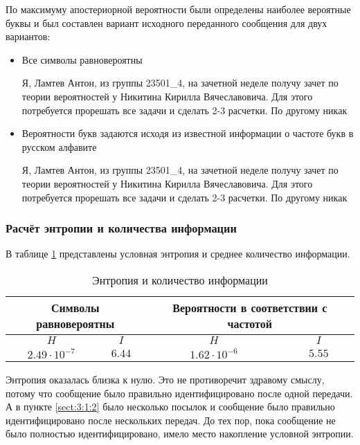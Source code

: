 По максимуму апостериорной вероятности были определены наиболее вероятные буквы и был составлен вариант исходного переданного сообщения для двух вариантов:

\begin{itemize}
	\item Все символы равновероятны
	
	
	Я, Ламтев Антон, из группы 23501\_4, на зачетной неделе получу зачет по теории вероятностей у Никитина Кирилла Вячеславовича. Для этого потребуется прорешать все задачи и сделать 2-3 расчетки. По другому никак	
	
	\item Вероятности букв задаются исходя из известной информации о частоте букв в русском алфавите	
	
	
	Я, Ламтев Антон, из группы 23501\_4, на зачетной неделе получу зачет по теории вероятностей у Никитина Кирилла Вячеславовича. Для этого потребуется прорешать все задачи и сделать 2-3 расчетки. По другому никак
		
\end{itemize}

\subsubsection{Расчёт энтропии и количества информации}

В таблице \ref{table:entr:info} представлены условная энтропия и среднее количество информации.

\begin{table}[H]
\begin{center}
	\caption{Энтропия и количество информации}
	\label{table:entr:info}
	\def\tabcolsep{6pt}
	\begin{tabular}{|c|c|c|c|}
		\hline
		\multicolumn{2}{|c|}{Символы равновероятны} &
		\multicolumn{2}{c|}{Вероятности в соответствии с частотой} \\ 
		\hline
		$H$ &
		$I$ &
		$H$ &
		$I$ \\ 
		\hline
		$2.49 \cdot 10^{-7}$ &
		$6.44$ &
		$1.62 \cdot 10^{-6}$ &
		$5.55$ \\
		\hline
	\end{tabular}
\end{center}
\end{table}

Энтропия оказалась близка к нулю. Это не противоречит здравому смыслу, потому что сообщение было правильно идентифицировано после одной передачи. А в пункте \ref{sect:3:1:2} было несколько посылок и сообщение было правильно идентифицировано после нескольких передач. До тех пор, пока сообщение не было полностью идентифицировано, имело место накопление условной энтропии.


